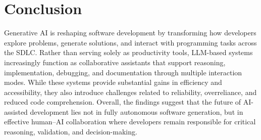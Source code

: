 \section{Conclusion}
Generative AI is reshaping software development by transforming how developers explore problems, generate solutions, and interact with programming tasks across the SDLC. Rather than serving solely as productivity tools, LLM-based systems increasingly function as collaborative assistants that support reasoning, implementation, debugging, and documentation through multiple interaction modes. While these systems provide substantial gains in efficiency and accessibility, they also introduce challenges related to reliability, overreliance, and reduced code comprehension. Overall, the findings suggest that the future of AI-assisted development lies not in fully autonomous software generation, but in effective human–AI collaboration where developers remain responsible for critical reasoning, validation, and decision-making.